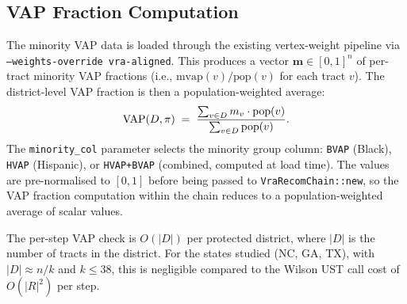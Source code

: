 \subsection{VAP Fraction Computation}

The minority VAP data is loaded through the existing vertex-weight pipeline
via \texttt{--weights-override vra-aligned}.
This produces a vector $\mathbf{m} \in [0,1]^n$ of per-tract minority VAP
fractions (i.e., $\mathrm{mvap}(v) / \mathrm{pop}(v)$ for each tract $v$).
The district-level VAP fraction is then a population-weighted average:
\[
  \mathrm{VAP}(D, \pi) \;=\;
  \frac{\sum_{v \in D} m_v \cdot \mathrm{pop}(v)}{\sum_{v \in D} \mathrm{pop}(v)}.
\]
The \texttt{minority\_col} parameter selects the minority group column:
\texttt{BVAP} (Black), \texttt{HVAP} (Hispanic), or \texttt{HVAP+BVAP}
(combined, computed at load time).
The values are pre-normalised to $[0,1]$ before being passed to
\texttt{VraRecomChain::new}, so the VAP fraction computation within the
chain reduces to a population-weighted average of scalar values.

The per-step VAP check is $O(|D|)$ per protected district, where $|D|$ is
the number of tracts in the district.
For the states studied (NC, GA, TX), with $|D| \approx n/k$ and
$k \leq 38$, this is negligible compared to the Wilson UST call cost of
$O(|R|^2)$ per step.